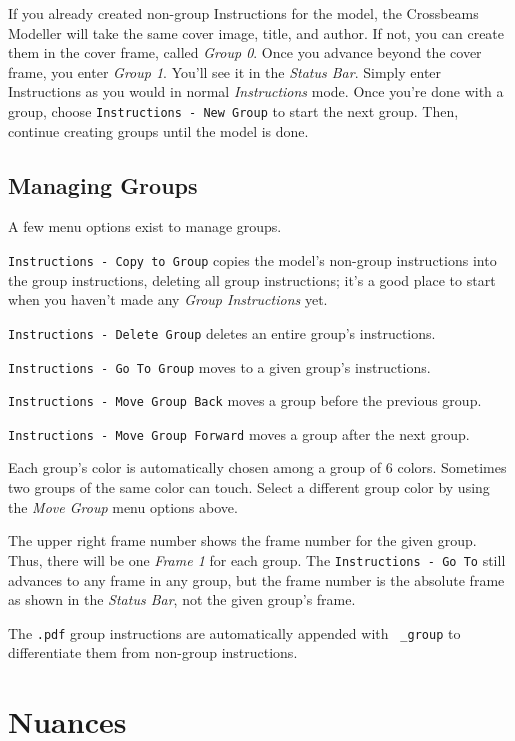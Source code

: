 \documentclass[12pt]{report}
\begin{document}
If you already created non-group Instructions for the model, the
Crossbeams Modeller will take the same cover image, title, and author.
If not, you can create them in the cover frame, called \emph{Group 0}.
Once you advance beyond the cover frame, you enter \emph{Group 1}.
You'll see it in the \emph{Status Bar}.  Simply enter Instructions as
you would in normal \emph{Instructions} mode.  Once you're done with a
group, choose {\tt Instructions - New Group} to start the next group.
Then, continue creating groups until the model is done.

\subsection{Managing Groups}

A few menu options exist to manage groups.

\begin{list}{}{}
  \item {\tt Instructions - Copy to Group} copies the model's non-group instructions into the group instructions, deleting all group instructions; it's a good place to start when you haven't made any \emph{Group Instructions} yet.
  \item {\tt Instructions - Delete Group} deletes an entire group's instructions.
  \item {\tt Instructions - Go To Group} moves to a given group's instructions.
  \item {\tt Instructions - Move Group Back} moves a group before the previous group.
  \item {\tt Instructions - Move Group Forward} moves a group after the next group.
\end{list}

Each group's color is automatically chosen among a group of 6 colors.
Sometimes two groups of the same color can touch.  Select a different
group color by using the \emph{Move Group} menu options above.

The upper right frame number shows the frame number for the given
group.  Thus, there will be one \emph{Frame 1} for each group.  The
{\tt Instructions - Go To} still advances to any frame in any group,
but the frame number is the absolute frame as shown in the
\emph{Status Bar}, not the given group's frame.

The {\tt .pdf} group instructions are automatically appended with {\tt
  \_group} to differentiate them from non-group instructions.

\section{Nuances}
\end{document}
